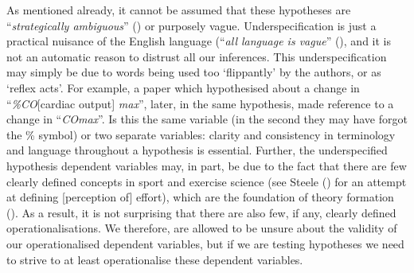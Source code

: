 \documentclass[
]{article}
\begin{document}
As mentioned already, it cannot be assumed that these hypotheses are
``\emph{strategically ambiguous}''
() or purposely vague.
Underspecification is just a practical nuisance of the English language
(``\emph{all language is vague}'' (), and it is not an automatic reason to distrust all our
inferences. This underspecification may simply be due to words being
used too `flippantly' by the authors, or as `reflex acts'. For example,
a paper which hypothesised about a change in ``\emph{\%CO}{[}cardiac
output{]} \emph{max}'', later, in the same hypothesis, made reference to
a change in ``\emph{COmax}''. Is this the same variable (in the second
they may have forgot the \% symbol) or two separate variables: clarity
and consistency in terminology and language throughout a hypothesis is
essential. Further, the underspecified hypothesis dependent variables
may, in part, be due to the fact that there are few clearly defined
concepts in sport and exercise science (see Steele
() for an attempt at defining
{[}perception of{]} effort), which are the foundation of theory
formation (). As a result, it is
not surprising that there are also few, if any, clearly defined
operationalisations. We therefore, are allowed to be unsure about the
validity of our operationalised dependent variables, but if we are
testing hypotheses we need to strive to at least operationalise these
dependent variables.
\end{document}
